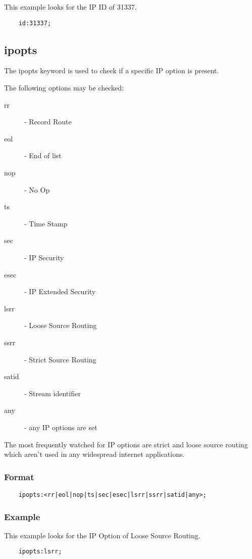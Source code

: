 \documentclass[english]{report}
\begin{document}
This example looks for the IP ID of 31337.

\begin{verbatim}
    id:31337;
\end{verbatim}

\subsection{ipopts}

The ipopts keyword is used to check if a specific IP option is present.

The following options may be checked:

\begin{description}
\item [rr] - Record Route 
\item [eol] - End of list 
\item [nop] - No Op 
\item [ts] - Time Stamp 
\item [sec] - IP Security
\item [esec] - IP Extended Security
\item [lsrr] - Loose Source Routing 
\item [ssrr] - Strict Source Routing 
\item [satid] - Stream identifier
\item [any] - any IP options are set
\end{description}

The most frequently watched for IP options are strict and loose source routing
which aren't used in any widespread internet applications.

\subsubsection{Format}

\begin{verbatim}
    ipopts:<rr|eol|nop|ts|sec|esec|lsrr|ssrr|satid|any>;
\end{verbatim}

\subsubsection{Example}

This example looks for the IP Option of Loose Source Routing.

\begin{verbatim}
    ipopts:lsrr;
\end{verbatim}
\end{document}
